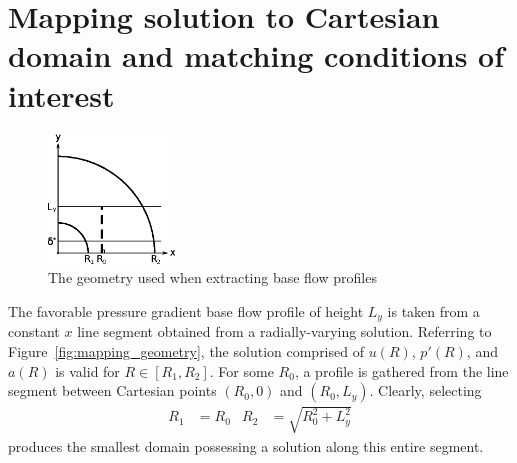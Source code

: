 \documentclass[letterpaper,11pt,nointlimits,reqno]{amsart}
\begin{document}
\clearpage

\section{Mapping solution to Cartesian domain and matching conditions of interest}

\begin{figure}[h]
  \centering
  \includegraphics[width=0.30\textwidth]{baseflow_schematic}
  \caption{
      \label{fig:mapping_geometry}
      The geometry used when extracting base flow profiles
  }
\end{figure}

The favorable pressure gradient base flow profile of height $L_y$ is taken from
a constant $x$ line segment obtained from a radially-varying solution.
Referring to Figure~\eqref{fig:mapping_geometry}, the solution comprised of
$u\!\left(R\right)$, $p'\!\left(R\right)$, and $a\!\left(R\right)$ is valid for
$R\in\left[R_1,R_2\right]$.  For some $R_0$, a profile is gathered from the
line segment between Cartesian points $\left(R_0,0\right)$ and
$\left(R_0,L_y\right)$.  Clearly, selecting
\begin{align}
  R_1 &= R_0
&
  R_2 &= \sqrt{R_0^2 + L_y^2}
\end{align}
produces the smallest domain possessing a solution along this entire segment.
\end{document}
